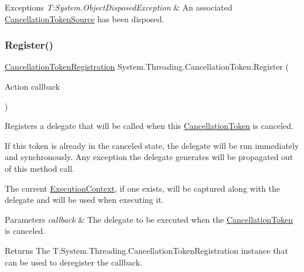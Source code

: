 \begin{DoxyExceptions}{Exceptions}
{\em T\+:\+System.\+Object\+Disposed\+Exception} & An associated \hyperlink{}{Cancellation\+Token\+Source} has been disposed.\\
\hline
\end{DoxyExceptions}
\mbox{\label{struct_system_1_1_threading_1_1_cancellation_token_a62e3229ea2687c0b5f6e7ede454b8236}} 
\subsubsection{\texorpdfstring{Register()}{Register()}\hspace{0.1cm}{\footnotesize\ttfamily [1/2]}}
{\footnotesize\ttfamily \hyperlink{struct_system_1_1_threading_1_1_cancellation_token_registration}{Cancellation\+Token\+Registration} System.\+Threading.\+Cancellation\+Token.\+Register (\begin{DoxyParamCaption}\item[{Action}]{callback }\end{DoxyParamCaption})\hspace{0.3cm}{\ttfamily [inline]}}



Registers a delegate that will be called when this \hyperlink{}{Cancellation\+Token} is canceled. 

If this token is already in the canceled state, the delegate will be run immediately and synchronously. Any exception the delegate generates will be propagated out of this method call. 

The current \hyperlink{}{Execution\+Context}, if one exists, will be captured along with the delegate and will be used when executing it. 


\begin{DoxyParams}{Parameters}
{\em callback} & The delegate to be executed when the \hyperlink{}{Cancellation\+Token} is canceled.\\
\hline
\end{DoxyParams}
\begin{DoxyReturn}{Returns}
The T\+:\+System.\+Threading.\+Cancellation\+Token\+Registration instance that can be used to deregister the callback.
\end{DoxyReturn}

